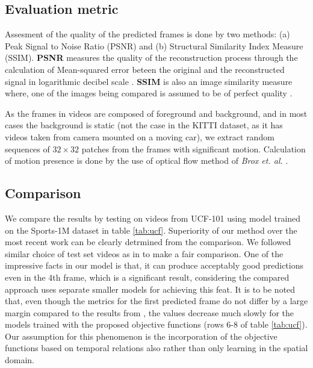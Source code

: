 \documentclass{article}
\begin{document}
\subsection{Evaluation metric}
  Assesment of the quality of the predicted frames is done by two methods:
  (a) Peak Signal to Noise Ratio (PSNR) and (b) Structural Similarity Index Measure (SSIM).
  \textbf{PSNR} measures the quality of the reconstruction process through the calculation of Mean-squared error beteen the original and the reconstructed signal in logarithmic decibel scale \cite{bovik2009essential}.
  \textbf{SSIM} is also an image similarity measure where, one of the images being compared is assumed to be of perfect quality \cite{wang2004image}.
  
  As the frames in videos are composed of foreground and background, and in most cases the background is static (not the case in the KITTI dataset, as it has videos taken from camera mounted on a moving car), we extract random sequences of $ 32 \times 32 $ patches from the frames with significant motion. Calculation of motion presence is done by the use of optical flow method of \textit{Brox et. al.} \cite{brox2011large}.
  
\subsection{Comparison}
  We compare the results by testing on videos from UCF-101 using model trained on the Sports-1M dataset in table \ref{tab:ucf}. Superiority of our method over the most recent work \cite{mathieu2015deep} can be clearly detrmined from the comparison. We followed similar choice of test set videos as in \cite{mathieu2015deep} to make a fair comparison. One of the impressive facts in our model is that, it can produce acceptably good predictions even in the 4th frame, which is a significant result, considering the compared approach uses separate smaller models for achieving this feat. It is to be noted that, even though the metrics for the first predicted frame do not differ by a large margin compared to the results from \cite{mathieu2015deep}, the values decrease much slowly for the models trained with the proposed objective functions (rows 6-8 of table \ref{tab:ucf}). Our assumption for this phenomenon is the incorporation of the objective functions based on temporal relations also rather than only learning in the spatial domain. 
  
\end{document}
